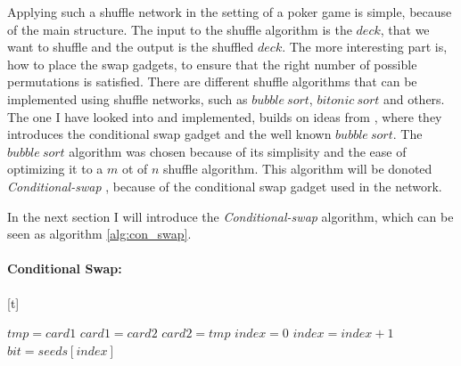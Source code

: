 \documentclass[twoside,11pt,openright]{report}
\newcommand{\CS}{\textit{Conditional-swap} }
\begin{document}
Applying such a shuffle network in the setting of a poker game is simple, because of the main structure. The input to the shuffle algorithm is the $deck$, that we want to shuffle and the output is the shuffled $deck$. The more interesting part is, how to place the swap gadgets, to ensure that the right number of possible permutations is satisfied. There are different shuffle algorithms that can be implemented using shuffle networks, such as $bubble~sort$, $bitonic~sort$ and others. The one I have looked into and implemented, builds on ideas from \cite{psi}, where they introduces the conditional swap gadget and the well known $bubble~sort$. The $bubble~sort$ algorithm was chosen because of its simplisity and the ease of optimizing it to a $m$ ot of $n$ shuffle algorithm. This algorithm will be donoted \CS, because of the conditional swap gadget used in the network.

\bigskip

In the next section I will introduce the \CS algorithm, which can be seen as algorithm \ref{alg:con_swap}.

\bigskip

\paragraph{Conditional Swap:}[t]
\label{sec:con_swap}

\begin{algorithm}[t]
\caption{\textbf{\textit{Conditional swap}} \newline
    $deck$ is initialized to hold $n$ cards $c$. \newline
    $seed$ is initialized to hold $\frac{n^2}{2}$ random $bit$ values where $bit_i\in[0,1]$ for $i\in [1,\frac{n^2}{2}]$.
}
\label{alg:con_swap}

\begin{algorithmic}[1]
\State $tmp = card1$
\State $card1 = card2$
\State $card2 = tmp$
\EndIf
\EndFunction
\State
{}
\State $index = 0$
\State $index = index + 1$
\State $bit = seeds[index]$
\State {}
\EndFor
\EndFor
\EndFunction
\end{algorithmic}
\end{algorithm}
\end{document}
